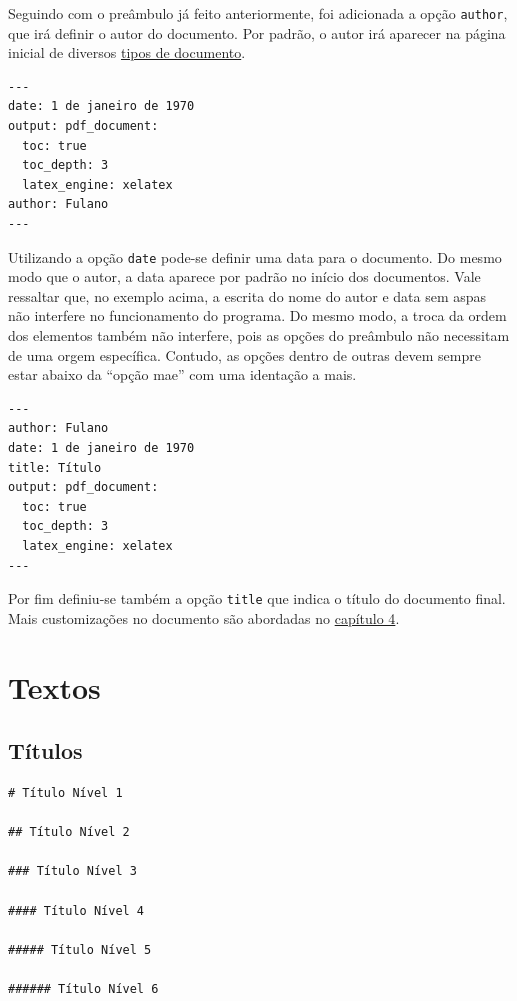 \documentclass[
]{book}
\begin{document}
Seguindo com o preâmbulo já feito anteriormente, foi adicionada a opção \texttt{author}, que irá definir o autor do documento. Por padrão, o autor irá aparecer na página inicial de diversos \protect\hyperlink{possuxedveis-tipos-de-outputs}{tipos de documento}.

\begin{verbatim}
---
date: 1 de janeiro de 1970
output: pdf_document:
  toc: true
  toc_depth: 3
  latex_engine: xelatex
author: Fulano
---
\end{verbatim}

Utilizando a opção \texttt{date} pode-se definir uma data para o documento. Do mesmo modo que o autor, a data aparece por padrão no início dos documentos.
Vale ressaltar que, no exemplo acima, a escrita do nome do autor e data sem aspas não interfere no funcionamento do programa. Do mesmo modo, a troca da ordem dos elementos também não interfere, pois as opções do preâmbulo não necessitam de uma orgem específica. Contudo, as opções dentro de outras devem sempre estar abaixo da ``opção mae'' com uma identação a mais.

\begin{verbatim}
---
author: Fulano
date: 1 de janeiro de 1970
title: Título
output: pdf_document:
  toc: true
  toc_depth: 3
  latex_engine: xelatex
---
\end{verbatim}

Por fim definiu-se também a opção \texttt{title} que indica o título do documento final. Mais customizações no documento são abordadas no \protect\hyperlink{depois-crio}{capítulo 4}.

\hypertarget{textos}{%
\section{Textos}\label{textos}}

\hypertarget{tuxedtulos}{%
\subsection{Títulos}\label{tuxedtulos}}

\begin{verbatim}
# Título Nível 1

## Título Nível 2

### Título Nível 3

#### Título Nível 4

##### Título Nível 5

###### Título Nível 6
\end{verbatim}
\end{document}
